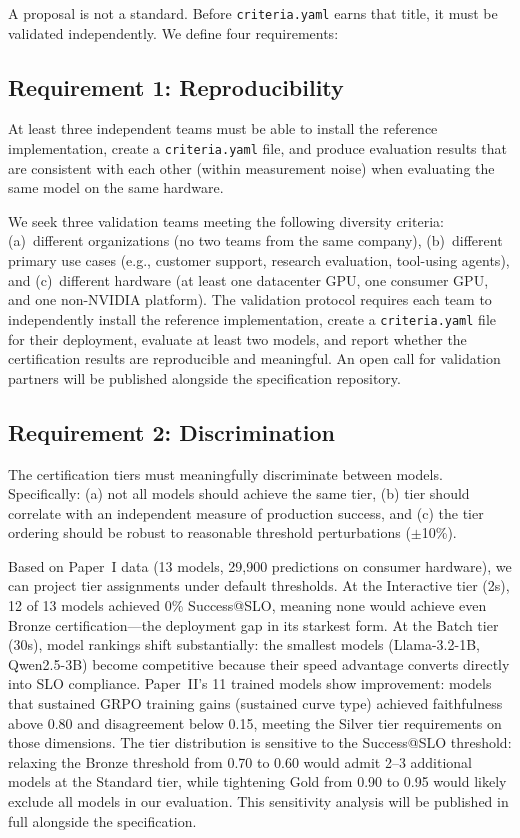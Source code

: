 \documentclass[11pt]{article}
\newcommand{\criteriayaml}{\texttt{criteria.yaml}}
\begin{document}
A proposal is not a standard. Before \criteriayaml{} earns that title, it must be validated independently. We define four requirements:

\subsection{Requirement 1: Reproducibility}

At least three independent teams must be able to install the reference implementation, create a \criteriayaml{} file, and produce evaluation results that are consistent with each other (within measurement noise) when evaluating the same model on the same hardware.

We seek three validation teams meeting the following diversity criteria: (a)~different organizations (no two teams from the same company), (b)~different primary use cases (e.g., customer support, research evaluation, tool-using agents), and (c)~different hardware (at least one datacenter GPU, one consumer GPU, and one non-NVIDIA platform). The validation protocol requires each team to independently install the reference implementation, create a \criteriayaml{} file for their deployment, evaluate at least two models, and report whether the certification results are reproducible and meaningful. An open call for validation partners will be published alongside the specification repository.

\subsection{Requirement 2: Discrimination}

The certification tiers must meaningfully discriminate between models. Specifically: (a) not all models should achieve the same tier, (b) tier should correlate with an independent measure of production success, and (c) the tier ordering should be robust to reasonable threshold perturbations ($\pm$10\%).

Based on Paper~I data (13 models, 29{,}900 predictions on consumer hardware), we can project tier assignments under default thresholds. At the Interactive tier (2s), 12 of 13 models achieved 0\% Success@SLO, meaning none would achieve even Bronze certification---the deployment gap in its starkest form. At the Batch tier (30s), model rankings shift substantially: the smallest models (Llama-3.2-1B, Qwen2.5-3B) become competitive because their speed advantage converts directly into SLO compliance. Paper~II's 11 trained models show improvement: models that sustained GRPO training gains (sustained curve type) achieved faithfulness above 0.80 and disagreement below 0.15, meeting the Silver tier requirements on those dimensions. The tier distribution is sensitive to the Success@SLO threshold: relaxing the Bronze threshold from 0.70 to 0.60 would admit 2--3 additional models at the Standard tier, while tightening Gold from 0.90 to 0.95 would likely exclude all models in our evaluation. This sensitivity analysis will be published in full alongside the specification.
\end{document}
